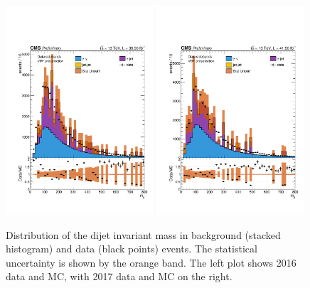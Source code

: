 \begin{figure}
  \centering
  \includegraphics[width=0.49\textwidth]{Figures/Categorisation/mjj_2016.pdf}
  \includegraphics[width=0.49\textwidth]{Figures/Categorisation/mjj_2017.pdf}
  \caption{
  Distribution of the dijet invariant mass in background (stacked histogram) 
  and data (black points) events.
  The statistical uncertainty is shown by the orange band.
  The left plot shows 2016 data and MC,
  with 2017 data and MC on the right.
  }
  \label{fig:cat_mjjinput}
\end{figure}


